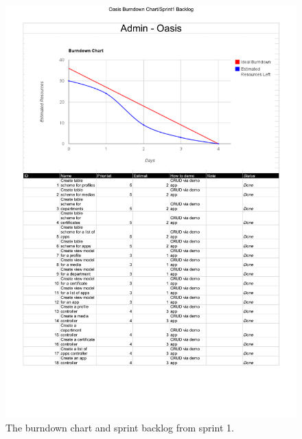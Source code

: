 \begin{figure}[H]
	\centering
		\includegraphics[width=\textwidth]{Images/sprint_backlogs/Oasis_Burndown_Chart_-_Sprint1_Backlog}
	\caption{The burndown chart and sprint backlog from sprint 1.}
	\label{fig:sprint1}
\end{figure}

